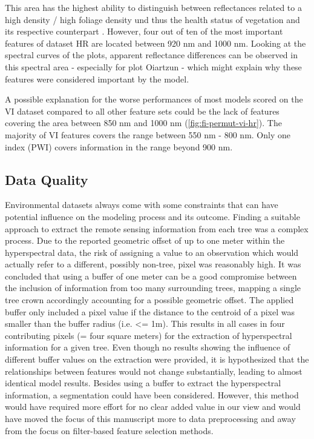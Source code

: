 \documentclass[final]{IEEEtran}
\begin{document}
This area has the highest ability to distinguish between reflectances related to a high density / high foliage density und thus the health status of vegetation and its respective counterpart \cite{horler1983}.
However, four out of ten of the most important features of dataset HR are located between 920 nm and 1000 nm.
Looking at the spectral curves of the plots, apparent reflectance differences can be observed in this spectral area - especially for plot Oiartzun - which might explain why these features were considered important by the model.

A possible explanation for the worse performances of most models scored on the VI dataset compared to all other feature sets could be the lack of features covering the area between 850 nm and 1000 nm (\autoref{fig:fi-permut-vi-hr}).
The majority of VI features covers the range between 550 nm - 800 nm.
Only one index (PWI) covers information in the range beyond 900 nm.

\subsection{Data Quality}
\label{subsec:data-quality}

Environmental datasets always come with some constraints that can have potential influence on the modeling process and its outcome.
Finding a suitable approach to extract the remote sensing information from each tree was a complex process.
Due to the reported geometric offset of up to one meter within the hyperspectral data, the risk of assigning a value to an observation which would actually refer to a different, possibly non-tree, pixel was reasonably high.
It was concluded that using a buffer of one meter can be a good compromise between the inclusion of information from too many surrounding trees, mapping a single tree crown accordingly accounting for a possible geometric offset.
The applied buffer only included a pixel value if the distance to the centroid of a pixel was smaller than the buffer radius (i.e. <= 1m).
This results in all cases in four contributing pixels (= four square meters) for the extraction of hyperspectral information for a given tree.
Even though no results showing the influence of different buffer values on the extraction were provided, it is hypothesized that the relationships between features would not change substantially, leading to almost identical model results.
Besides using a buffer to extract the hyperspectral information, a segmentation could have been considered.
However, this method would have required more effort for no clear added value in our view and would have moved the focus of this manuscript more to data preprocessing and away from the focus on filter-based feature selection methods.
\end{document}
